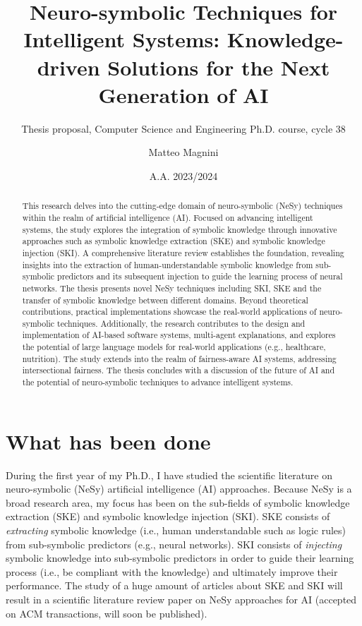 \documentclass[]{scrartcl}
\title{
    Neuro-symbolic Techniques for Intelligent Systems:
    Knowledge-driven Solutions for the Next Generation of AI
}
\subtitle{Thesis proposal, Computer Science and Engineering Ph.D. course, cycle 38}
\author{Matteo Magnini}
\date{A.A. 2023/2024}
\begin{document}
    
    \maketitle
    
    \begin{abstract}
        This research delves into the cutting-edge domain of neuro-symbolic (NeSy) techniques within the realm of artificial intelligence (AI).
        Focused on advancing intelligent systems, the study explores the integration of symbolic knowledge through innovative approaches such as symbolic knowledge extraction (SKE) and symbolic knowledge injection (SKI).
        A comprehensive literature review establishes the foundation, revealing insights into the extraction of human-understandable symbolic knowledge from sub-symbolic predictors and its subsequent injection to guide the learning process of neural networks.
        The thesis presents novel NeSy techniques including SKI, SKE and the transfer of symbolic knowledge between different domains.
        Beyond theoretical contributions, practical implementations showcase the real-world applications of neuro-symbolic techniques.
        Additionally, the research contributes to the design and implementation of AI-based software systems, multi-agent explanations, and explores the potential of large language models for real-world applications (e.g., healthcare, nutrition).
        The study extends into the realm of fairness-aware AI systems, addressing intersectional fairness.
        The thesis concludes with a discussion of the future of AI and the potential of neuro-symbolic techniques to advance intelligent systems.
    \end{abstract}
    
    \section{What has been done}
    \label{sec:done}

    During the first year of my Ph.D., I have studied the scientific literature on neuro-symbolic (NeSy) artificial intelligence (AI) approaches.
    Because NeSy is a broad research area, my focus has been on the sub-fields of symbolic knowledge extraction (SKE) and symbolic knowledge injection (SKI).
    SKE consists of \emph{extracting} symbolic knowledge (i.e., human understandable such as logic rules) from sub-symbolic predictors (e.g., neural networks).
    SKI consists of \emph{injecting} symbolic knowledge into sub-symbolic predictors in order to guide their learning process (i.e., be compliant with the knowledge) and ultimately improve their performance.
    The study of a huge amount of articles about SKE and SKI will result in a scientific literature review paper on NeSy approaches for AI (accepted on ACM transactions, will soon be published).
\end{document}
